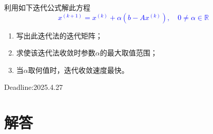 \documentclass[cn,hazy,green,11pt,normal]{elegantnote}
\begin{document}
\begin{enumerate}
            利用如下迭代公式解此方程\textcolor{blue}{\[x^{(k+1)}=x^{(k)}+\alpha (b-Ax^{(k)}),\quad 0 \neq\alpha\in\mathbb{R}\]}
            \begin{enumerate}
                \item 写出此迭代法的迭代矩阵；
                \item 求使该迭代法收敛时参数$\alpha$的最大取值范围；
                \item 当$\alpha$取何值时，迭代收敛速度最快。
            \end{enumerate}

    \end{enumerate}

    Deadline:2025.4.27

\section{解答}
\end{document}
